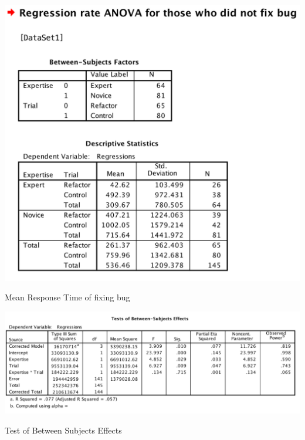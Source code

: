 \begin{table}[h]
	\centering
	\includegraphics[scale=.5]{regressionRate}
	\caption{Mean Response Time of fixing bug}
\end{table}

\begin{table}[h]
	\centering
	\includegraphics[scale=.5]{betweenSubjectEffects2}
	\caption{Test of Between Subjects Effects}
\end{table}

